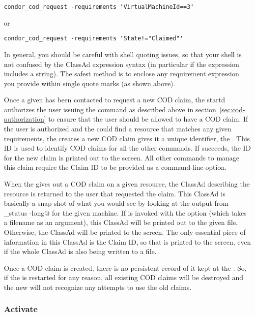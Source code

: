 \begin{verbatim}
condor_cod_request -requirements 'VirtualMachineId==3'
\end{verbatim}
or
\begin{verbatim}
condor_cod_request -requirements 'State!="Claimed"'
\end{verbatim}

In general, you should be careful with shell quoting issues, so that
your shell is not confused by the ClassAd expression syntax (in
particular if the expression includes a string).
The safest method is to enclose any requirement expression you provide
within single quote marks (as shown above).
 
Once a given  has been contacted to request a new COD
claim, the startd authorizes the user issuing the command as described
above in section~\ref{sec:cod-authorization} to ensure that the user
should be allowed to have a COD claim.
If the user is authorized and the  could find a
resource that matches any given requirements, the 
creates a new COD claim gives it a unique identifier, the .
This ID is used to identify COD claims for all the other commands.
If  succeeds, the ID for the new claim is printed
out to the screen.
All other commands to manage this claim require the Claim ID to be
provided as a command-line option.

When the  gives out a COD claim on a given resource,
the ClassAd describing the resource is returned to the user that
requested the claim. 
This ClassAd is basically a snap-shot of what you would see by looking
at the output from \verb@condor_status -long@ for the given machine.
If  is invoked with the  option
(which takes a filename as an argument), this ClassAd will be printed
out to the given file.
Otherwise, the ClassAd will be printed to the screen.
The only essential piece of information in this ClassAd is the Claim
ID, so that is printed to the screen, even if the whole ClassAd is
also being written to a file.

\Note Once a COD claim is created, there is no persistent record of it
kept at the .
So, if the  is restarted for any reason, all existing
COD claims will be destroyed and the new  will not
recognize any attempts to use the old claims.


\subsubsection{\label{sec:cod-claim-activate}Activate}

